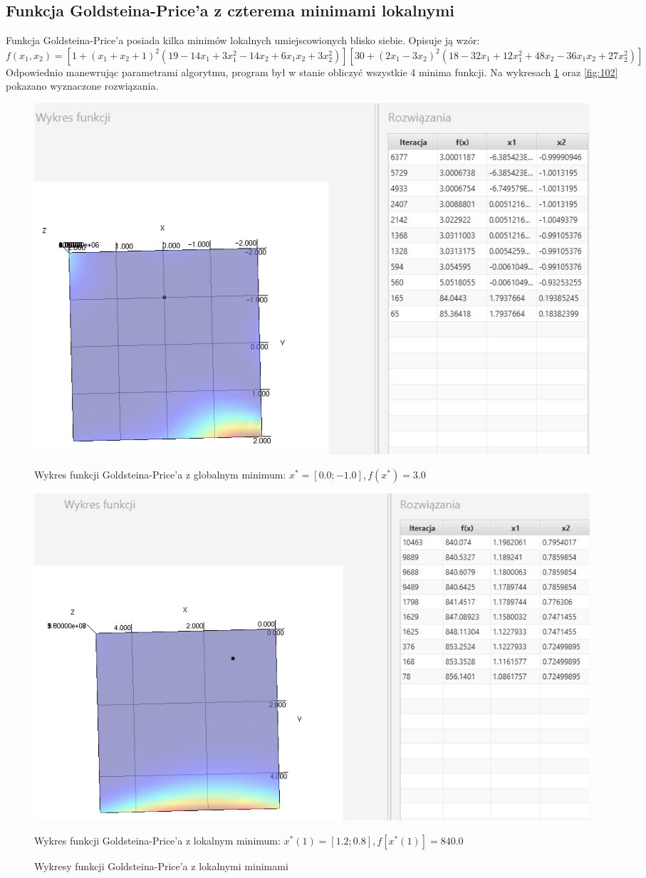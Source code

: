 \documentclass[10pt, a4paper]{article}
\begin{document}
\subsection{Funkcja Goldsteina-Price’a z czterema minimami lokalnymi}
\label{subsec:cenyzlota}
Funkcja Goldsteina-Price’a posiada kilka minimów lokalnych umiejscowionych blisko siebie. Opisuje ją wzór: $$f(x_{1},x_{2}) = [1+(x_{1}+x_{2}+1)^2(19-14x_{1}+3x_{1}^2-14x_{2}+6x_{1}x_{2}+3x_{2}^2)][30+(2x_{1}-3x_{2})^2(18-32x_{1}+12x_{1}^2+48x_{2}-36x_{1}x_{2}+27x_{2}^2)]$$ Odpowiednio manewrując parametrami algorytmu, program był w stanie obliczyć wszystkie 4 minima funkcji. Na wykresach \ref{fig:101} oraz \ref{fig:102} pokazano wyznaczone rozwiązania.
\begin{figure}[htbp] 
	\begin{minipage}[b]{1\textwidth}
		\centering
		\includegraphics[width=\linewidth]{images/goldprice0.PNG}
		\caption{Wykres funkcji Goldsteina-Price’a z globalnym minimum: $x^*=[0.0; -1.0], f(x^*)=3.0$ }
	\end{minipage} 
	\begin{minipage}[b]{1\textwidth}
		\centering
		\includegraphics[width=\linewidth]{images/goldprice1.PNG} 
		\caption{Wykres funkcji Goldsteina-Price’a z lokalnym minimum: $x^*(1)=[1.2; 0.8], f[x^*(1)] = 840.0$ }
	\end{minipage}
	\label{fig:101}
	\caption{Wykresy funkcji Goldsteina-Price’a z lokalnymi minimami }
\end{figure}
\end{document}
